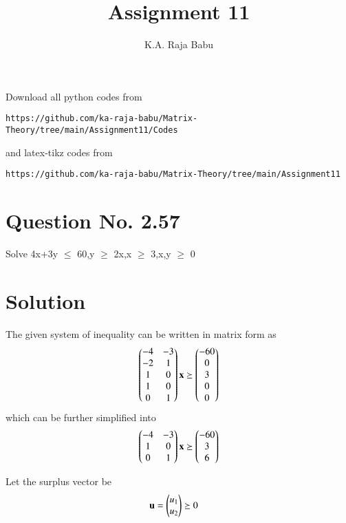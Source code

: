 \documentclass[journal,12pt,twocolumn]{IEEEtran}
\begin{document}
     \def\rightbox#1{\makebox[0in][r]{#1}}
     \def\centbox#1{\makebox[0in]{#1}}
     \def\topbox#1{\raisebox{-\baselineskip}[0in][0in]{#1}}
     \def\midbox#1{\raisebox{-0.5\baselineskip}[0in][0in]{#1}}
\vspace{3cm}
\title{Assignment 11}
\author{K.A. Raja Babu}
\maketitle
\newpage
\bigskip
\renewcommand{\thefigure}{\theenumi}
\renewcommand{\thetable}{\theenumi}
Download all python codes from 
\begin{lstlisting}
https://github.com/ka-raja-babu/Matrix-Theory/tree/main/Assignment11/Codes
\end{lstlisting}
%
and latex-tikz codes from 
%
\begin{lstlisting}
https://github.com/ka-raja-babu/Matrix-Theory/tree/main/Assignment11
\end{lstlisting}
%
\section{Question No. 2.57}

Solve 4x+3y $\leq$ 60,y $\geq$ 2x,x $\geq$ 3,x,y $\geq$ 0 

\section{Solution}

The given system of inequality can be written in matrix form as
\begin{align}
    \begin{pmatrix}-4 & -3 \\ -2 & 1 \\ 1 & 0 \\ 1 & 0 \\ 0 & 1\end{pmatrix}\mathbf{x} \succeq \begin{pmatrix}-60\\0\\3\\0\\0\end{pmatrix}
\end{align}
which can be further simplified into 
\begin{align}
    \begin{pmatrix}-4 & -3 \\ 1 & 0 \\ 0 & 1\end{pmatrix}\mathbf{x} \succeq \begin{pmatrix}-60\\3\\6\end{pmatrix}
\end{align}

Let the surplus vector be
\begin{align}
    \mathbf{u} &= \begin{pmatrix}u_1\\u_2\end{pmatrix} \succeq 0
\end{align}
\end{document}
